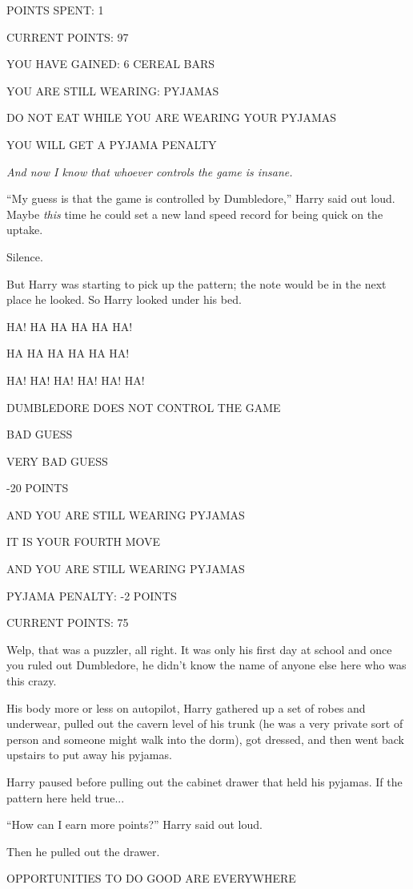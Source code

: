 POINTS SPENT: 1

CURRENT POINTS: 97

YOU HAVE GAINED: 6 CEREAL BARS

YOU ARE STILL WEARING: PYJAMAS

DO NOT EAT WHILE YOU ARE WEARING YOUR PYJAMAS

YOU WILL GET A PYJAMA PENALTY

\emph{And now I know that whoever controls the game is insane.}

``My guess is that the game is controlled by Dumbledore,'' Harry said
out loud. Maybe \emph{this} time he could set a new land speed record
for being quick on the uptake.

Silence.

But Harry was starting to pick up the pattern; the note would be in the
next place he looked. So Harry looked under his bed.

HA! HA HA HA HA HA!

HA HA HA HA HA HA!

HA! HA! HA! HA! HA! HA!

DUMBLEDORE DOES NOT CONTROL THE GAME

BAD GUESS

VERY BAD GUESS

-20 POINTS

AND YOU ARE STILL WEARING PYJAMAS

IT IS YOUR FOURTH MOVE

AND YOU ARE STILL WEARING PYJAMAS

PYJAMA PENALTY: -2 POINTS

CURRENT POINTS: 75

Welp, that was a puzzler, all right. It was only his first day at school
and once you ruled out Dumbledore, he didn't know the name of anyone
else here who was this crazy.

His body more or less on autopilot, Harry gathered up a set of robes and
underwear, pulled out the cavern level of his trunk (he was a very
private sort of person and someone might walk into the dorm), got
dressed, and then went back upstairs to put away his pyjamas.

Harry paused before pulling out the cabinet drawer that held his
pyjamas. If the pattern here held true...

``How can I earn more points?'' Harry said out loud.

Then he pulled out the drawer.

OPPORTUNITIES TO DO GOOD ARE EVERYWHERE

